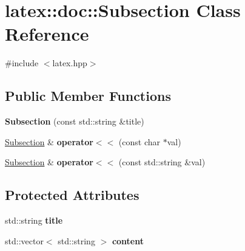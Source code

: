 \hypertarget{classlatex_1_1doc_1_1Subsection}{\section{latex\-:\-:doc\-:\-:Subsection Class Reference}
\label{classlatex_1_1doc_1_1Subsection}
}


{\ttfamily \#include $<$latex.\-hpp$>$}

\subsection*{Public Member Functions}
\begin{DoxyCompactItemize}
\item 
\hypertarget{classlatex_1_1doc_1_1Subsection_a58c86ee6e9d450b75d84a5c4e91ad54a}{{\bfseries Subsection} (const std\-::string \&title)}\label{classlatex_1_1doc_1_1Subsection_a58c86ee6e9d450b75d84a5c4e91ad54a}

\item 
\hypertarget{classlatex_1_1doc_1_1Subsection_a8c8a6a26148c2316ca8f512ae35ad8da}{\hyperlink{classlatex_1_1doc_1_1Subsection}{Subsection} \& {\bfseries operator$<$$<$} (const char $\ast$val)}\label{classlatex_1_1doc_1_1Subsection_a8c8a6a26148c2316ca8f512ae35ad8da}

\item 
\hypertarget{classlatex_1_1doc_1_1Subsection_a7efa65925d268faf43e353a52041e230}{\hyperlink{classlatex_1_1doc_1_1Subsection}{Subsection} \& {\bfseries operator$<$$<$} (const std\-::string \&val)}\label{classlatex_1_1doc_1_1Subsection_a7efa65925d268faf43e353a52041e230}

\end{DoxyCompactItemize}
\subsection*{Protected Attributes}
\begin{DoxyCompactItemize}
\item 
\hypertarget{classlatex_1_1doc_1_1Subsection_a8d54abcb5a9364cf63e9279b40cfcbf6}{std\-::string {\bfseries title}}\label{classlatex_1_1doc_1_1Subsection_a8d54abcb5a9364cf63e9279b40cfcbf6}

\item 
\hypertarget{classlatex_1_1doc_1_1Subsection_a6d79b427fd95a046a292184777212a3f}{std\-::vector$<$ std\-::string $>$ {\bfseries content}}\label{classlatex_1_1doc_1_1Subsection_a6d79b427fd95a046a292184777212a3f}

\end{DoxyCompactItemize}
